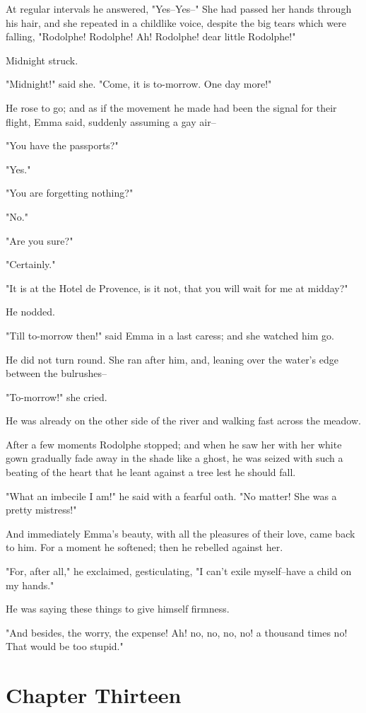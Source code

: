 \documentclass{tufte-book}
\begin{document}
At regular intervals he answered, "Yes--Yes--" She had passed her hands
through his hair, and she repeated in a childlike voice, despite the big
tears which were falling, "Rodolphe! Rodolphe! Ah! Rodolphe! dear little
Rodolphe!"

Midnight struck.

"Midnight!" said she. "Come, it is to-morrow. One day more!"

He rose to go; and as if the movement he made had been the signal for
their flight, Emma said, suddenly assuming a gay air--

"You have the passports?"

"Yes."

"You are forgetting nothing?"

"No."

"Are you sure?"

"Certainly."

"It is at the Hotel de Provence, is it not, that you will wait for me at
midday?"

He nodded.

"Till to-morrow then!" said Emma in a last caress; and she watched him
go.

He did not turn round. She ran after him, and, leaning over the water's
edge between the bulrushes--

"To-morrow!" she cried.

He was already on the other side of the river and walking fast across
the meadow.

After a few moments Rodolphe stopped; and when he saw her with her white
gown gradually fade away in the shade like a ghost, he was seized with
such a beating of the heart that he leant against a tree lest he should
fall.

"What an imbecile I am!" he said with a fearful oath. "No matter! She
was a pretty mistress!"

And immediately Emma's beauty, with all the pleasures of their love,
came back to him. For a moment he softened; then he rebelled against
her.

"For, after all," he exclaimed, gesticulating, "I can't exile
myself--have a child on my hands."

He was saying these things to give himself firmness.

"And besides, the worry, the expense! Ah! no, no, no, no! a thousand
times no! That would be too stupid."



\chapter{Chapter Thirteen}
\end{document}
